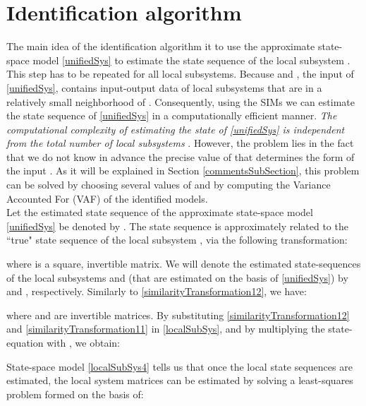 \documentclass[journal,10pt]{IEEEtran}
\begin{document}
\section{Identification algorithm}
\label{identSection}

The main idea of the identification algorithm it to use the approximate state-space model \eqref{unifiedSys} to estimate the state sequence of the local subsystem . This step has to be repeated for all  local subsystems. Because  and , the input  of \eqref{unifiedSys}, contains input-output data of local subsystems that are in a relatively small neighborhood of . Consequently, using the SIMs \cite{verhaegen2007} we can estimate the state sequence of \eqref{unifiedSys} in a computationally efficient manner. \textit{The computational complexity of estimating the state of \eqref{unifiedSys} is independent from the total number of local subsystems }. However, the problem lies in the fact that we do not know in advance the precise value of  that determines the form of the input . As it will be explained in Section \ref{commentsSubSection}, this problem can be solved by choosing several values of  and by computing the Variance Accounted For (VAF) of the identified models.
\\
Let the estimated state sequence of the approximate state-space model \eqref{unifiedSys} be denoted by . The state sequence  is approximately related to the ``true" state sequence of the local subsystem , via the following transformation:
\begin{small}

\end{small}
where  is a square, invertible matrix. We will denote the estimated state-sequences of the local subsystems  and  (that are estimated on the basis of \eqref{unifiedSys}) by  and , respectively. Similarly to \eqref{similarityTransformation12}, we have:
\begin{small}

\end{small}
where  and  are invertible matrices. By substituting \eqref{similarityTransformation12} and \eqref{similarityTransformation11} in \eqref{localSubSys}, and by multiplying the state-equation with , we obtain:
\begin{small}

\end{small}
State-space model \eqref{localSubSys4} tells us that once the local state sequences are estimated, the local system matrices  can be estimated by solving a least-squares problem formed on the basis of:
\end{document}
